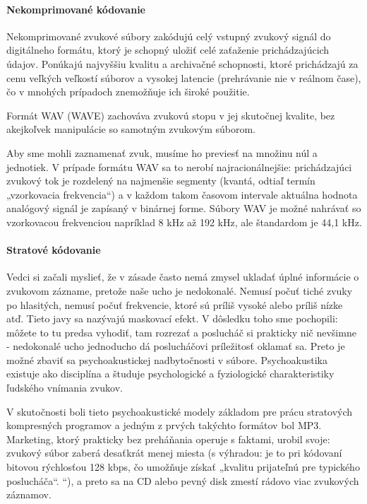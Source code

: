 \documentclass[10pt,twoside,slovak,a4paper]{article}
\begin{document}
\paragraph{Nekomprimované kódovanie} \label{nekomprimované} \cite{Logvinov}

Nekomprimované zvukové súbory zakódujú celý vstupný zvukový signál do digitálneho formátu, ktorý je schopný uložiť celé zaťaženie prichádzajúcich údajov. Ponúkajú najvyššiu kvalitu a archivačné schopnosti, ktoré prichádzajú za cenu veľkých veľkostí súborov a vysokej latencie (prehrávanie nie v reálnom čase), čo v mnohých prípadoch znemožňuje ich široké použitie.  

Formát WAV (WAVE) zachováva zvukovú stopu v jej skutočnej kvalite, bez akejkoľvek manipulácie so samotným zvukovým súborom.

Aby sme mohli zaznamenať zvuk, musíme ho previesť na množinu núl a jednotiek. V prípade formátu WAV sa to nerobí najracionálnejšie: prichádzajúci zvukový tok je rozdelený na najmenšie segmenty (kvantá, odtiaľ termín „vzorkovacia frekvencia“) a v každom takom časovom intervale aktuálna hodnota analógový signál je zapísaný v binárnej forme. Súbory WAV je možné nahrávať so vzorkovacou frekvenciou napríklad 8 kHz až 192 kHz, ale štandardom je 44,1 kHz.

\paragraph{Stratové kódovanie}  \label{Stratové}\cite{Logvinov}

Vedci si začali myslieť, že v zásade často nemá zmysel ukladať úplné informácie o zvukovom zázname, pretože naše ucho je nedokonalé. Nemusí počuť tiché zvuky po hlasitých, nemusí počuť frekvencie, ktoré sú príliš vysoké alebo príliš nízke atď. Tieto javy sa nazývajú maskovací efekt.
V dôsledku toho sme pochopili: môžete to tu predsa vyhodiť, tam rozrezať a poslucháč si prakticky nič nevšimne - nedokonalé ucho jednoducho dá poslucháčovi príležitosť oklamať sa. Preto je možné zbaviť sa psychoakustickej nadbytočnosti v súbore.
Psychoakustika existuje ako disciplína a študuje psychologické a fyziologické charakteristiky ľudského vnímania zvukov.

V skutočnosti boli tieto psychoakustické modely základom pre prácu stratových kompresných programov a jedným z prvých takýchto formátov bol MP3. Marketing, ktorý prakticky bez preháňania operuje s faktami, urobil svoje: zvukový súbor zaberá desaťkrát menej miesta (s výhradou: je to pri kódovaní bitovou rýchlosťou 128 kbps, čo umožňuje získať „kvalitu prijateľnú pre typického poslucháča“. “), a preto sa na CD alebo pevný disk zmestí rádovo viac zvukových záznamov.
\end{document}
